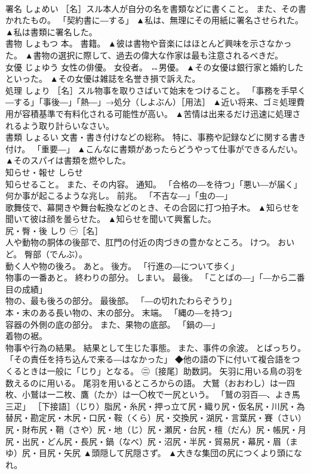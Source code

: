 \documentclass[8pt]{extreport}
\begin{document}
\begin{CJK}{UTF8}{min}
\\	署名	しょめい	［名］スル本人が自分の名を書類などに書くこと。 また、その書かれたもの。 「契約書に―する」	▲私は、無理にその用紙に署名させられた。 ▲私は書類に署名した。
\\	書物	しょもつ	本。 書籍。	▲彼は書物や音楽にはほとんど興味を示さなかった。 ▲書物の選択に際して、過去の偉大な作家は最も注意されるべきだ。
\\	女優	じょゆう	女性の俳優。 女役者。 ↔男優。	▲その女優は銀行家と婚約したといった。 ▲その女優は雑誌を名誉き損で訴えた。
\\	処理	しょり	［名］スル物事を取りさばいて始末をつけること。 「事務を手早く―する」「事後―」「熱―」→処分（しよぶん）［用法］	▲近い将来、ゴミ処理費用が容積基準で有料化される可能性が高い。 ▲苦情は出来るだけ迅速に処理されるよう取り計らいなさい。
\\	書類	しょるい	文書・書き付けなどの総称。 特に、事務や記録などに関する書き付け。 「重要―」	▲こんなに書類があったらどうやって仕事ができるんだい。 ▲そのスパイは書類を燃やした。
\\	知らせ・報せ	しらせ	
\\	知らせること。 また、その内容。 通知。 「合格の―を待つ」「悪い―が届く」 
\\	何か事が起こるような兆し。 前兆。 「不吉な―」「虫の―」 
\\	歌舞伎で、幕開きや舞台転換などのとき、その合図に打つ拍子木。	▲知らせを聞いて彼は顔を曇らせた。 ▲知らせを聞いて興奮した。
\\	尻・臀・後	しり	㊀［名］ 
\\	人や動物の胴体の後部で、肛門の付近の肉づきの豊かなところ。 けつ。 おいど。 臀部（でんぶ）。 
\\	動く人や物の後ろ。 あと。 後方。 「行進の―について歩く」 
\\	物事の一番あと。 終わりの部分。 しまい。 最後。 「ことばの―」「―から二番目の成績」 
\\	物の、最も後ろの部分。 最後部。 「―の切れたわらぞうり」 
\\	本・末のある長い物の、末の部分。 末端。 「縄の―を持つ」 
\\	容器の外側の底の部分。 また、果物の底部。 「鍋の―」 
\\	着物の裾。 
\\	物事や行為の結果。 結果として生じた事態。 また、事件の余波。 とばっちり。 「その責任を持ち込んで来る―はなかった」 ◆他の語の下に付いて複合語をつくるときは一般に「じり」となる。 ㊁〔接尾〕助数詞。 矢羽に用いる鳥の羽を数えるのに用いる。 尾羽を用いるところからの語。 大鷲（おおわし）は一四枚、小鷲は一二枚、鷹（たか）は一〇枚で一尻という。 「鷲の羽百―、よき馬三疋」 ［下接語］（じり）脂尻・糸尻・押っ立て尻・織り尻・仮名尻・川尻・為替尻・勘定尻・木尻・口尻・鞍（くら）尻・交換尻・湖尻・言葉尻・賽（さい）尻・財布尻・鞘（さや）尻・地（じ）尻・瀬尻・台尻・檀（だん）尻・帳尻・月尻・出尻・どん尻・長尻・鍋（なべ）尻・沼尻・半尻・貿易尻・幕尻・眉（まゆ）尻・目尻・矢尻	▲頭隠して尻隠さず。 ▲大きな集団の尻につくより頭になれ。

\end{CJK}
\end{document}
